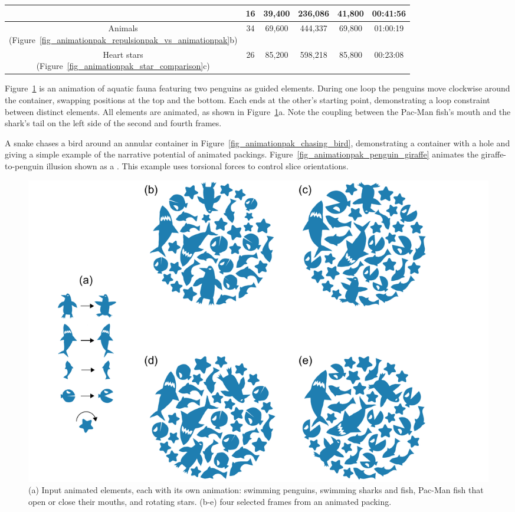 \begin{table}[t!]
\begin{tabular}{|c|c|c|c|c|c|}
& 16         & 39,400             & 236,086            & 41,800   & 00:41:56        
\\ \hline
\makecell{Animals            \\ (Figure~\ref{fig_animationpak_repulsionpak_vs_animationpak}b)}  
& 34         & 69,600             & 444,337            & 69,800   & 01:00:19        
\\ \hline
\makecell{Heart stars         \\ (Figure~\ref{fig_animationpak_star_comparison}c)}  
& 26         & 85,200             & 598,218            & 85,800   & 00:23:08        
\\ \hline
\end{tabular}
\end{table}



Figure~\ref{fig_animationpak_teaser} is an animation of aquatic fauna featuring two
penguins as guided elements.  During one loop the penguins move clockwise
around the container, swapping positions at the top and the bottom.
Each ends at the other's starting point, demonstrating a loop constraint
between distinct elements.  All elements are animated, as shown in 
Figure~\ref{fig_animationpak_teaser}a.  Note the coupling between the Pac-Man fish's
mouth and the shark's tail on the left side of the second and fourth frames.

A snake chases a bird around an annular container in 
Figure~\ref{fig_animationpak_chasing_bird}, demonstrating a container with a hole
and giving a simple example of the narrative potential of animated
packings.  Figure~\ref{fig_animationpak_penguin_giraffe} animates the giraffe-to-penguin
illusion shown as a .  
This example
uses torsional forces to control slice orientations.

\begin{figure}[h!]
  \centering
  \includegraphics[width=1.0\textwidth]{figures/animationpak/teaser.pdf}
  \caption[An animated packing of aquatic fauna]
  {\label{fig_animationpak_teaser}
  (a) Input animated elements,
  each with its own animation: swimming penguins, swimming sharks and fish,
  Pac-Man fish that open or close their mouths, and rotating stars. 
  (b-e) four selected frames from an animated packing.  
  }
\end{figure}

